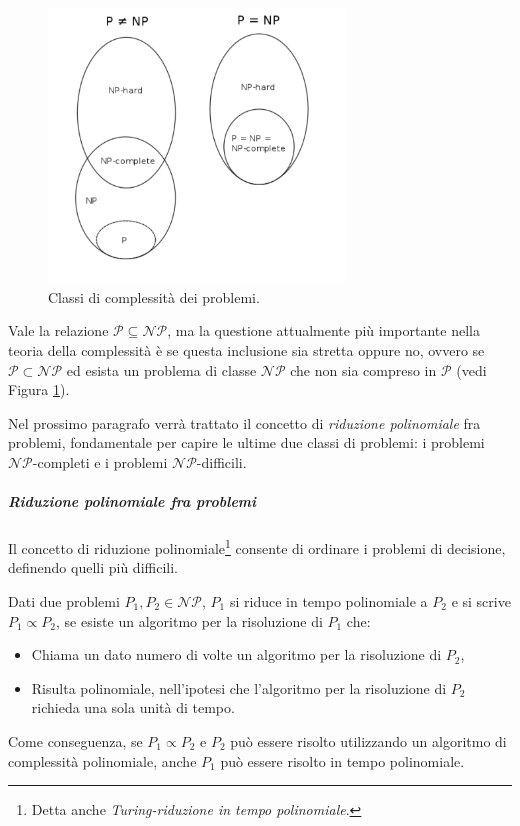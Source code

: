 \begin{figure}[ht]
 \begin{center}
  \includegraphics[width=0.7\textwidth]{appendici/figure/ClassiComplessita.pdf}
  \caption{Classi di complessità dei problemi.}
  \label{fig:ClassiComplessita}
 \end{center}
\end{figure}


Vale la relazione $\mathcal{P} \subseteq \mathcal{NP}$, ma la questione attualmente più 
importante nella teoria della complessità è se questa inclusione sia stretta oppure 
no, ovvero se $\mathcal{P} \subset \mathcal{NP}$ ed esista un problema di classe 
$\mathcal{NP}$ che non sia compreso in $\mathcal{P}$ \cite{GasarchPoll} (vedi Figura 
\ref{fig:ClassiComplessita}).

Nel prossimo paragrafo verrà trattato il concetto di \emph{riduzione polinomiale} fra 
problemi, fondamentale per capire le ultime due classi di problemi: i problemi 
$\mathcal{NP}$-completi e i problemi $\mathcal{NP}$-difficili.

\subparagraph{Riduzione polinomiale fra problemi}
Il concetto di riduzione polinomiale\footnote{Detta anche \emph{Turing-riduzione in tempo 
polinomiale}.} consente di ordinare i problemi di decisione, definendo quelli più 
difficili.

\begin{mydef}
 Dati due problemi $P_1, P_2 \in \mathcal{NP}$, $P_1$ si riduce in tempo polinomiale a 
$P_2$ e si scrive $P_1 \propto P_2$, se esiste un algoritmo per la risoluzione di $P_1$ 
che:
\begin{itemize}
 \item Chiama un dato numero di volte un algoritmo per la risoluzione di $P_2$,
 \item Risulta polinomiale, nell'ipotesi che l'algoritmo per la risoluzione di $P_2$ 
richieda una sola unità di tempo.
\end{itemize}
\end{mydef}
Come conseguenza, se $P_1 \propto P_2$ e $P_2$ può essere risolto utilizzando un 
algoritmo di complessità polinomiale, anche $P_1$ può essere risolto in tempo polinomiale.

